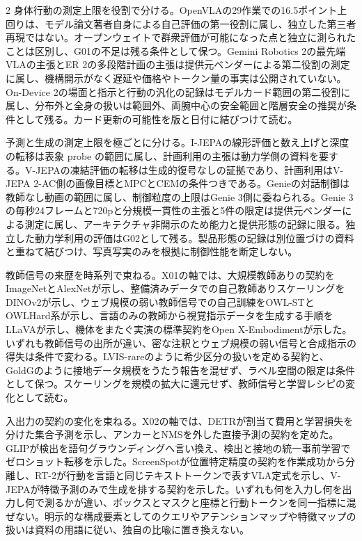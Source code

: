 \documentclass[lualatex,a4paper,10pt]{jlreq}
\begin{document}
\begin{multicols}{2}
\noindent 身体行動の測定上限を役割で分ける。OpenVLAの29作業での16.5ポイント上回りは、モデル論文著者自身による自己評価の第一役割に属し、独立した第三者再現ではない。オープンウェイトで群衆評価が可能になった点と独立に測られたことは区別し、G01の不足は残る条件として保つ。Gemini Robotics 2の最先端VLAの主張とER 2の多段階計画の主張は提供元ベンダーによる第二役割の測定に属し、機構開示がなく遅延や価格やトークン量の事実は公開されていない。On-Device 2の場面と指示と行動の汎化の記録はモデルカード範囲の第二役割に属し、分布外と全身の扱いは範囲外、両腕中心の安全範囲と階層安全の推奨が条件として残る。カード更新の可能性を版と日付に結びつけて読む。\autocite{vmd098,vmd099,vmd100}\par\medskip
\noindent 予測と生成の測定上限を極ごとに分ける。I-JEPAの線形評価と数え上げと深度の転移は表象 probe の範囲に属し、計画利用の主張は動力学側の資料を要する。V-JEPAの凍結評価の転移は生成的復号なしの証拠であり、計画利用はV-JEPA 2-AC側の画像目標とMPCとCEMの条件つきである。Genieの対話制御は教師なし動画の範囲に属し、制御粒度の上限はGenie 3側に委ねられる。Genie 3の毎秒24フレームと720pと分規模一貫性の主張と5件の限定は提供元ベンダーによる測定に属し、アーキテクチャ非開示のため能力と提供形態の記録に限る。独立した動力学利用の評価はG02として残る。製品形態の記録は別位置づけの資料と重ねて結びつけ、写真写実のみを根拠に制御性能を断定しない。\autocite{vmd103,vmd104,vmd105,vmd106,vmd107}\par\medskip
\noindent 教師信号の来歴を時系列で束ねる。X01の軸では、大規模教師ありの契約をImageNetとAlexNetが示し、整備済みデータでの自己教師ありスケーリングをDINOv2が示し、ウェブ規模の弱い教師信号での自己訓練をOWL-STとOWLHard系が示し、言語のみの教師から視覚指示データを生成する手順をLLaVAが示し、機体をまたぐ実演の標準契約をOpen X-Embodimentが示した。いずれも教師信号の出所が違い、密な注釈とウェブ規模の弱い信号と合成指示の得失は条件で変わる。LVIS-rareのように希少区分の扱いを定める契約と、GoldGのように接地データ規模をうたう報告を混ぜず、ラベル空間の限定は条件として保つ。スケーリングを規模の拡大に還元せず、教師信号と学習レシピの変化として読む。\autocite{vmd003,vmd035,vmd051,vmd062,vmd096}\par\medskip
\noindent 入出力の契約の変化を束ねる。X02の軸では、DETRが割当て費用と学習損失を分けた集合予測を示し、アンカーとNMSを外した直接予測の契約を定めた。GLIPが検出を語句グラウンディングへ言い換え、検出と接地の統一事前学習でゼロショット転移を示した。ScreenSpotが位置特定精度の契約を作業成功から分離し、RT-2が行動を言語と同じテキストトークンで表すVLA定式を示し、V-JEPAが特徴予測のみで生成を排する契約を示した。いずれも何を入力し何を出力し何で測るかが違い、ボックスとマスクと座標と行動トークンを同一指標に混ぜない。明示的な構成要素としてのクエリやアテンションマップや特徴マップの扱いは資料の用語に従い、独自の比喩に置き換えない。\autocite{vmd010,vmd047,vmd092,vmd097,vmd104}\par\medskip

\end{multicols}
\end{document}
